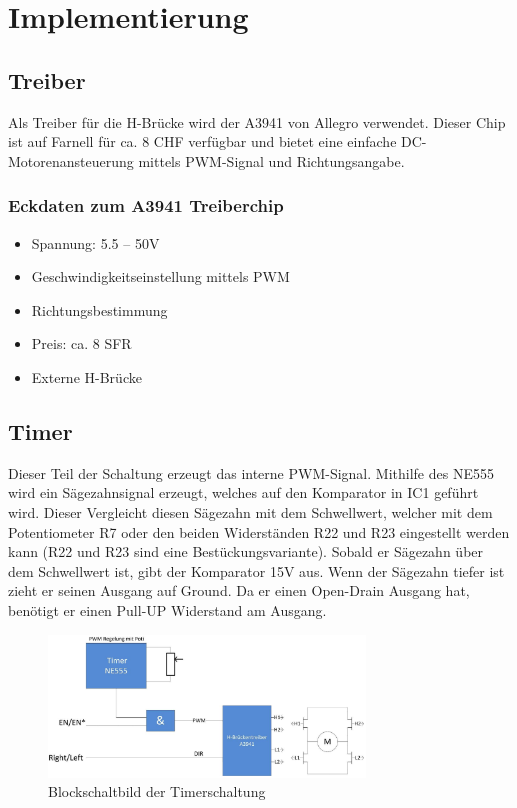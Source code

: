 \newpage
\section{Implementierung}

\subsection{Treiber}
Als Treiber für die H-Brücke wird der A3941 von Allegro verwendet. Dieser
Chip ist auf Farnell für ca. 8 CHF verfügbar und bietet eine einfache
DC-Motorenansteuerung mittels PWM-Signal und Richtungsangabe.

\subsubsection*{Eckdaten zum A3941 Treiberchip}
\begin{itemize}
	\item Spannung: 5.5 – 50V
	\item Geschwindigkeitseinstellung mittels PWM
	\item Richtungsbestimmung
	\item Preis: ca. 8 SFR
	\item Externe H-Brücke
\end{itemize}

\subsection{Timer}
Dieser Teil der Schaltung erzeugt das interne PWM-Signal. Mithilfe des
NE555 wird ein Sägezahnsignal erzeugt, welches auf den Komparator in IC1
geführt wird. Dieser Vergleicht diesen Sägezahn mit dem Schwellwert,
welcher mit dem Potentiometer R7 oder den beiden Widerständen R22 und R23
eingestellt werden kann (R22 und R23 sind eine Bestückungsvariante). 
Sobald er Sägezahn über dem Schwellwert ist, gibt der Komparator 15V aus.
Wenn der Sägezahn tiefer ist zieht er seinen Ausgang auf Ground. Da er
einen Open-Drain Ausgang hat, benötigt er einen Pull-UP Widerstand am
Ausgang.

\begin{figure}[h!]
	\centering
	\includegraphics[width=0.75\textwidth]{src/dc/fig/timer_block.png}
	\caption{Blockschaltbild der Timerschaltung}
\end{figure}

